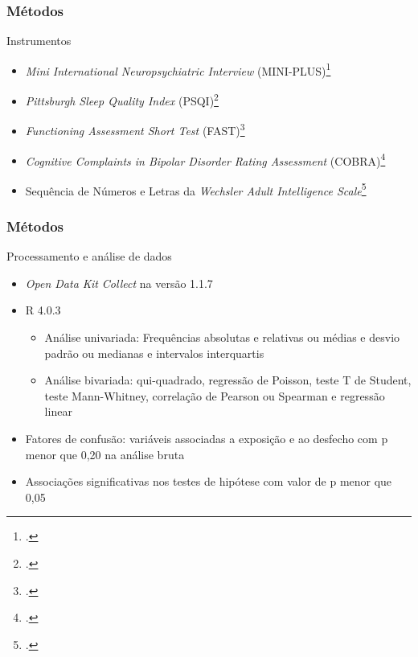 \documentclass{beamer}
\begin{document}
\begin{frame}
\frametitle{Métodos}

    \begin{block}{Instrumentos}
        \begin{itemize}
            \item \emph{Mini International Neuropsychiatric Interview} (MINI-PLUS)\footcite{amorim_mini_2000}
            \item \emph{Pittsburgh Sleep Quality Index} (PSQI)\footcite{bertolazi_validation_2011}
            \item \emph{Functioning Assessment Short Test} (FAST)\footcite{cacilhas_validity_2009}
            \item \emph{Cognitive Complaints in Bipolar Disorder Rating Assessment} (COBRA)\footcite{lima_validity_2018}
            \item Sequência de Números e Letras da \emph{Wechsler Adult Intelligence Scale}\footcite{wechsler_wais_2004}
        \end{itemize}
    \end{block}

\end{frame}

\begin{frame}
\frametitle{Métodos}

    \begin{block}{Processamento e análise de dados}
        \begin{itemize}
            \item \emph{Open Data Kit Collect} na versão 1.1.7       
            \item R 4.0.3
            \begin{itemize}
                \item Análise univariada: Frequências absolutas e relativas ou
                médias e desvio padrão ou medianas e intervalos interquartis
                \item Análise bivariada: qui-quadrado, regressão de Poisson,
                teste T de Student, teste Mann-Whitney, correlação de Pearson
                ou Spearman e regressão linear
            \end{itemize}
            \item Fatores de confusão: variáveis associadas a exposição e ao
            desfecho com p menor que 0,20 na análise bruta
            \item Associações significativas nos testes de hipótese com valor de p
            menor que 0,05
        \end{itemize}
    \end{block}

\end{frame}
\end{document}
